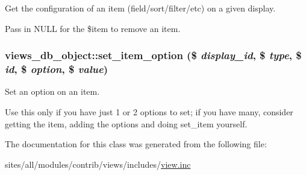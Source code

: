 Get the configuration of an item (field/sort/filter/etc) on a given display.

Pass in NULL for the \$item to remove an item. \hypertarget{classviews__db__object_722d39805c26c9ae909e644f2f887a86}{
\subsubsection[{set\_\-item\_\-option}]{\setlength{\rightskip}{0pt plus 5cm}views\_\-db\_\-object::set\_\-item\_\-option (\$ {\em display\_\-id}, \/  \$ {\em type}, \/  \$ {\em id}, \/  \$ {\em option}, \/  \$ {\em value})}}
\label{classviews__db__object_722d39805c26c9ae909e644f2f887a86}


Set an option on an item.

Use this only if you have just 1 or 2 options to set; if you have many, consider getting the item, adding the options and doing set\_\-item yourself. 

The documentation for this class was generated from the following file:\begin{CompactItemize}
\item 
sites/all/modules/contrib/views/includes/\hyperlink{view_8inc}{view.inc}\end{CompactItemize}
